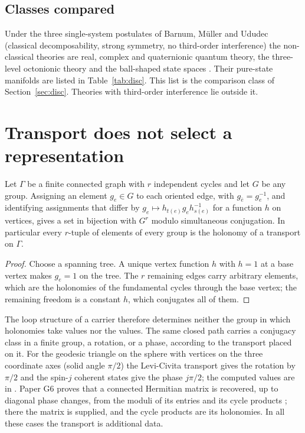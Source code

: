 \subsection{Classes compared}
Under the three single-system postulates of Barnum, M\"uller and Ududec (classical decomposability, strong symmetry, no third-order interference) the non-classical theories are real, complex and quaternionic quantum theory, the three-level octonionic theory and the ball-shaped state spaces \cite{bmu}. Their pure-state manifolds are listed in Table~\ref{tab:disc}. This list is the comparison class of Section~\ref{sec:disc}. Theories with third-order interference lie outside it.

\section{Transport does not select a representation}\label{sec:nonselection}

\begin{proposition}\label{prop:nonselection}
Let $\Gamma$ be a finite connected graph with $r$ independent cycles and let $G$ be any group. Assigning an element $g_e\in G$ to each oriented edge, with $g_{\bar e}=g_e^{-1}$, and identifying assignments that differ by $g_e\mapsto h_{t(e)}g_eh_{s(e)}^{-1}$ for a function $h$ on vertices, gives a set in bijection with $G^r$ modulo simultaneous conjugation. In particular every $r$-tuple of elements of every group is the holonomy of a transport on $\Gamma$.
\end{proposition}

\begin{proof}
Choose a spanning tree. A unique vertex function $h$ with $h=1$ at a base vertex makes $g_e=1$ on the tree. The $r$ remaining edges carry arbitrary elements, which are the holonomies of the fundamental cycles through the base vertex; the remaining freedom is a constant $h$, which conjugates all of them.
\end{proof}

The loop structure of a carrier therefore determines neither the group in which holonomies take values nor the values. The same closed path carries a conjugacy class in a finite group, a rotation, or a phase, according to the transport placed on it. For the geodesic triangle on the sphere with vertices on the three coordinate axes (solid angle $\pi/2$) the Levi-Civita transport gives the rotation by $\pi/2$ and the spin-$j$ coherent states give the phase $j\pi/2$; the computed values are in \cite{comp}. Paper G6 proves that a connected Hermitian matrix is recovered, up to diagonal phase changes, from the moduli of its entries and its cycle products \cite{g6}; there the matrix is supplied, and the cycle products are its holonomies. In all these cases the transport is additional data.

